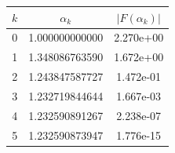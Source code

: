 \begin{tabular}{ccc}
\toprule
$k$ & $\alpha_k$ & $|F(\alpha_k)|$ \\
\midrule
0 & 1.000000000000 & 2.270e+00 \\
1 & 1.348086763590 & 1.672e+00 \\
2 & 1.243847587727 & 1.472e-01 \\
3 & 1.232719844644 & 1.667e-03 \\
4 & 1.232590891267 & 2.238e-07 \\
5 & 1.232590873947 & 1.776e-15 \\
\bottomrule
\end{tabular}
